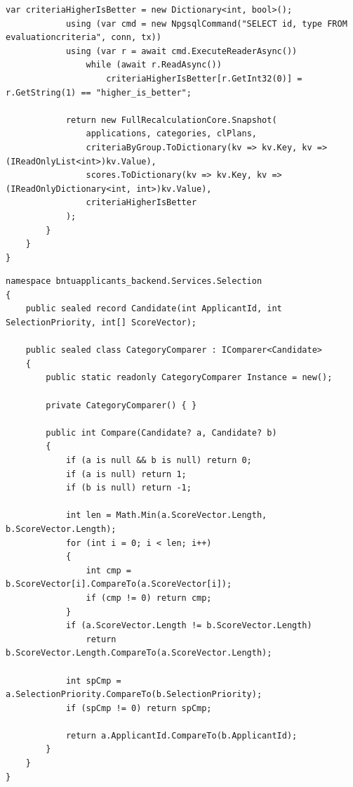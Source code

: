 \begin{lstlisting}[style=csharpstyle]
            var criteriaHigherIsBetter = new Dictionary<int, bool>();
            using (var cmd = new NpgsqlCommand("SELECT id, type FROM evaluationcriteria", conn, tx))
            using (var r = await cmd.ExecuteReaderAsync())
                while (await r.ReadAsync())
                    criteriaHigherIsBetter[r.GetInt32(0)] = r.GetString(1) == "higher_is_better";

            return new FullRecalculationCore.Snapshot(
                applications, categories, clPlans,
                criteriaByGroup.ToDictionary(kv => kv.Key, kv => (IReadOnlyList<int>)kv.Value),
                scores.ToDictionary(kv => kv.Key, kv => (IReadOnlyDictionary<int, int>)kv.Value),
                criteriaHigherIsBetter
            );
        }
    }
}
\end{lstlisting}

\begin{lstlisting}[style=csharpstyle]
namespace bntuapplicants_backend.Services.Selection
{
    public sealed record Candidate(int ApplicantId, int SelectionPriority, int[] ScoreVector);

    public sealed class CategoryComparer : IComparer<Candidate>
    {
        public static readonly CategoryComparer Instance = new();

        private CategoryComparer() { }

        public int Compare(Candidate? a, Candidate? b)
        {
            if (a is null && b is null) return 0;
            if (a is null) return 1;
            if (b is null) return -1;

            int len = Math.Min(a.ScoreVector.Length, b.ScoreVector.Length);
            for (int i = 0; i < len; i++)
            {
                int cmp = b.ScoreVector[i].CompareTo(a.ScoreVector[i]);
                if (cmp != 0) return cmp;
            }
            if (a.ScoreVector.Length != b.ScoreVector.Length)
                return b.ScoreVector.Length.CompareTo(a.ScoreVector.Length);

            int spCmp = a.SelectionPriority.CompareTo(b.SelectionPriority);
            if (spCmp != 0) return spCmp;

            return a.ApplicantId.CompareTo(b.ApplicantId);
        }
    }
}
\end{lstlisting}

